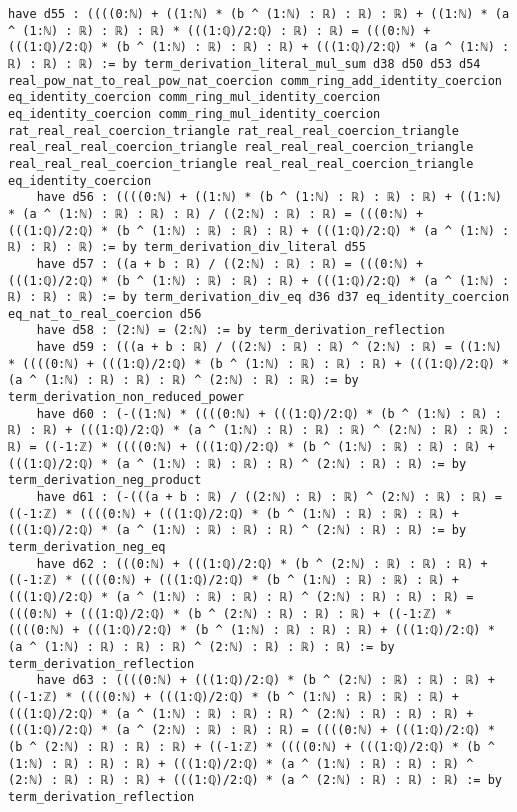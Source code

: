 \documentclass{article}
\begin{document}
\begin{tcolorbox}[colback=white!10, width=\linewidth]
\begin{lstlisting}[language=Lean4]
    have d55 : ((((0:ℕ) + ((1:ℕ) * (b ^ (1:ℕ) : ℝ) : ℝ) : ℝ) + ((1:ℕ) * (a ^ (1:ℕ) : ℝ) : ℝ) : ℝ) * (((1:ℚ)/2:ℚ) : ℝ) : ℝ) = (((0:ℕ) + (((1:ℚ)/2:ℚ) * (b ^ (1:ℕ) : ℝ) : ℝ) : ℝ) + (((1:ℚ)/2:ℚ) * (a ^ (1:ℕ) : ℝ) : ℝ) : ℝ) := by term_derivation_literal_mul_sum d38 d50 d53 d54 real_pow_nat_to_real_pow_nat_coercion comm_ring_add_identity_coercion eq_identity_coercion comm_ring_mul_identity_coercion eq_identity_coercion comm_ring_mul_identity_coercion rat_real_real_coercion_triangle rat_real_real_coercion_triangle real_real_real_coercion_triangle real_real_real_coercion_triangle real_real_real_coercion_triangle real_real_real_coercion_triangle eq_identity_coercion
    have d56 : ((((0:ℕ) + ((1:ℕ) * (b ^ (1:ℕ) : ℝ) : ℝ) : ℝ) + ((1:ℕ) * (a ^ (1:ℕ) : ℝ) : ℝ) : ℝ) / ((2:ℕ) : ℝ) : ℝ) = (((0:ℕ) + (((1:ℚ)/2:ℚ) * (b ^ (1:ℕ) : ℝ) : ℝ) : ℝ) + (((1:ℚ)/2:ℚ) * (a ^ (1:ℕ) : ℝ) : ℝ) : ℝ) := by term_derivation_div_literal d55
    have d57 : ((a + b : ℝ) / ((2:ℕ) : ℝ) : ℝ) = (((0:ℕ) + (((1:ℚ)/2:ℚ) * (b ^ (1:ℕ) : ℝ) : ℝ) : ℝ) + (((1:ℚ)/2:ℚ) * (a ^ (1:ℕ) : ℝ) : ℝ) : ℝ) := by term_derivation_div_eq d36 d37 eq_identity_coercion eq_nat_to_real_coercion d56
    have d58 : (2:ℕ) = (2:ℕ) := by term_derivation_reflection
    have d59 : (((a + b : ℝ) / ((2:ℕ) : ℝ) : ℝ) ^ (2:ℕ) : ℝ) = ((1:ℕ) * ((((0:ℕ) + (((1:ℚ)/2:ℚ) * (b ^ (1:ℕ) : ℝ) : ℝ) : ℝ) + (((1:ℚ)/2:ℚ) * (a ^ (1:ℕ) : ℝ) : ℝ) : ℝ) ^ (2:ℕ) : ℝ) : ℝ) := by term_derivation_non_reduced_power
    have d60 : (-((1:ℕ) * ((((0:ℕ) + (((1:ℚ)/2:ℚ) * (b ^ (1:ℕ) : ℝ) : ℝ) : ℝ) + (((1:ℚ)/2:ℚ) * (a ^ (1:ℕ) : ℝ) : ℝ) : ℝ) ^ (2:ℕ) : ℝ) : ℝ) : ℝ) = ((-1:ℤ) * ((((0:ℕ) + (((1:ℚ)/2:ℚ) * (b ^ (1:ℕ) : ℝ) : ℝ) : ℝ) + (((1:ℚ)/2:ℚ) * (a ^ (1:ℕ) : ℝ) : ℝ) : ℝ) ^ (2:ℕ) : ℝ) : ℝ) := by term_derivation_neg_product
    have d61 : (-(((a + b : ℝ) / ((2:ℕ) : ℝ) : ℝ) ^ (2:ℕ) : ℝ) : ℝ) = ((-1:ℤ) * ((((0:ℕ) + (((1:ℚ)/2:ℚ) * (b ^ (1:ℕ) : ℝ) : ℝ) : ℝ) + (((1:ℚ)/2:ℚ) * (a ^ (1:ℕ) : ℝ) : ℝ) : ℝ) ^ (2:ℕ) : ℝ) : ℝ) := by term_derivation_neg_eq
    have d62 : (((0:ℕ) + (((1:ℚ)/2:ℚ) * (b ^ (2:ℕ) : ℝ) : ℝ) : ℝ) + ((-1:ℤ) * ((((0:ℕ) + (((1:ℚ)/2:ℚ) * (b ^ (1:ℕ) : ℝ) : ℝ) : ℝ) + (((1:ℚ)/2:ℚ) * (a ^ (1:ℕ) : ℝ) : ℝ) : ℝ) ^ (2:ℕ) : ℝ) : ℝ) : ℝ) = (((0:ℕ) + (((1:ℚ)/2:ℚ) * (b ^ (2:ℕ) : ℝ) : ℝ) : ℝ) + ((-1:ℤ) * ((((0:ℕ) + (((1:ℚ)/2:ℚ) * (b ^ (1:ℕ) : ℝ) : ℝ) : ℝ) + (((1:ℚ)/2:ℚ) * (a ^ (1:ℕ) : ℝ) : ℝ) : ℝ) ^ (2:ℕ) : ℝ) : ℝ) : ℝ) := by term_derivation_reflection
    have d63 : ((((0:ℕ) + (((1:ℚ)/2:ℚ) * (b ^ (2:ℕ) : ℝ) : ℝ) : ℝ) + ((-1:ℤ) * ((((0:ℕ) + (((1:ℚ)/2:ℚ) * (b ^ (1:ℕ) : ℝ) : ℝ) : ℝ) + (((1:ℚ)/2:ℚ) * (a ^ (1:ℕ) : ℝ) : ℝ) : ℝ) ^ (2:ℕ) : ℝ) : ℝ) : ℝ) + (((1:ℚ)/2:ℚ) * (a ^ (2:ℕ) : ℝ) : ℝ) : ℝ) = ((((0:ℕ) + (((1:ℚ)/2:ℚ) * (b ^ (2:ℕ) : ℝ) : ℝ) : ℝ) + ((-1:ℤ) * ((((0:ℕ) + (((1:ℚ)/2:ℚ) * (b ^ (1:ℕ) : ℝ) : ℝ) : ℝ) + (((1:ℚ)/2:ℚ) * (a ^ (1:ℕ) : ℝ) : ℝ) : ℝ) ^ (2:ℕ) : ℝ) : ℝ) : ℝ) + (((1:ℚ)/2:ℚ) * (a ^ (2:ℕ) : ℝ) : ℝ) : ℝ) := by term_derivation_reflection

\end{lstlisting}
\end{tcolorbox}
\end{document}
